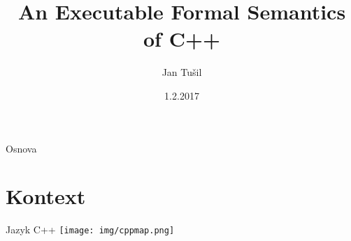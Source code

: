 \documentclass[11pt]{beamer}
\author{Jan Tušil}
\title{An Executable Formal Semantics of C++}
\institute{FI MU}
\date{1.2.2017}
\begin{document}







\begin{frame}
\titlepage
\end{frame}

\begin{frame}{Osnova}
\tableofcontents
\end{frame}


\section{Kontext}

\begin{frame}{Jazyk C++}
\texttt{[image: img/cppmap.png]}
\end{frame}
\end{document}
